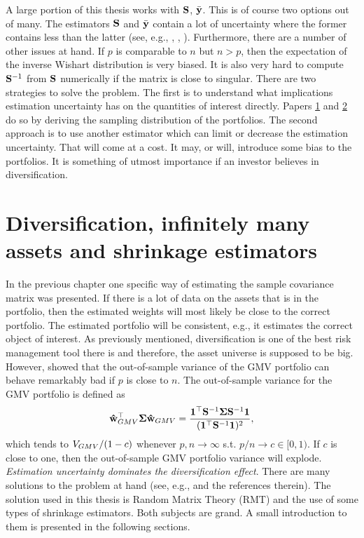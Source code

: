 \documentclass[12pt, oneside]{book}\usepackage{knitr}
\begin{document}
A large portion of this thesis works with $\mathbf{S}$, $\bar{\mathbf{y}}$.
This is of course two options out of many.
The estimators $\mathbf{S}$ and $\bar{\mathbf{y}}$ contain a lot of uncertainty where the former contains less than the latter (see, e.g., \citet{frankfurter1971portfolio}, \citet{merton1980estimating}, \citet{best1991sensitivity}). 
Furthermore, there are a number of other issues at hand.
If $p$ is comparable to $n$ but $n>p$, then the expectation of the inverse Wishart distribution is very biased.
It is also very hard to compute $\mathbf{S}^{-1}$ from $\mathbf{S}$ numerically if the matrix is close to singular.
There are two strategies to solve the problem.
The first is to understand what implications estimation uncertainty has on the quantities of interest directly.
Papers \hyperref[sec:paper1]{1} and \hyperref[sec:paper2]{2} do so by deriving the sampling distribution of the portfolios.
The second approach is to use another estimator which can limit or decrease the estimation uncertainty.
That will come at a cost.
It may, or will, introduce some bias to the portfolios.
It is something of utmost importance if an investor believes in diversification.

\chapter{Diversification, infinitely many assets and shrinkage estimators}\label{ch:highdim}


In the previous chapter one specific way of estimating the sample covariance matrix was presented.
If there is a lot of data on the assets that is in the portfolio, then the estimated weights will most likely be close to the correct portfolio.
The estimated portfolio will be consistent, e.g., it estimates the correct object of interest. 
As previously mentioned, diversification is one of the best risk management tool there is and therefore, the asset universe is supposed to be big.
However, \citet{bodnar2016optimal} showed that the out-of-sample variance of the GMV portfolio can behave remarkably bad if $p$ is close to $n$.
The out-of-sample variance for the GMV portfolio is defined as 
\begin{equation}\label{eqn:oot_var}
  \mathbf{\hat{w}}_{GMV}^\top \mathbf{\Sigma} \mathbf{\hat{w}}_{GMV} = \frac{\mathbf{1}^\top \mathbf{S}^{-1} \mathbf{\Sigma} \mathbf{S}^{-1} \mathbf{1} }{(\mathbf{1}^\top \mathbf{S}^{-1} \mathbf{1})^2},
\end{equation}
which tends to $V_{GMV}/(1-c)$ whenever $p,n \rightarrow \infty$ s.t. $p/n \rightarrow c \in [0,1)$. 
If $c$ is close to one, then the out-of-sample GMV portfolio variance will explode. 
\textit{Estimation uncertainty dominates the diversification effect}.
There are many solutions to the problem at hand (see, e.g., \citet{lw17} and the references therein). 
The solution used in this thesis is Random Matrix Theory (RMT) and the use of some types of shrinkage estimators. 
Both subjects are grand.
A small introduction to them is presented in the following sections.
\end{document}
